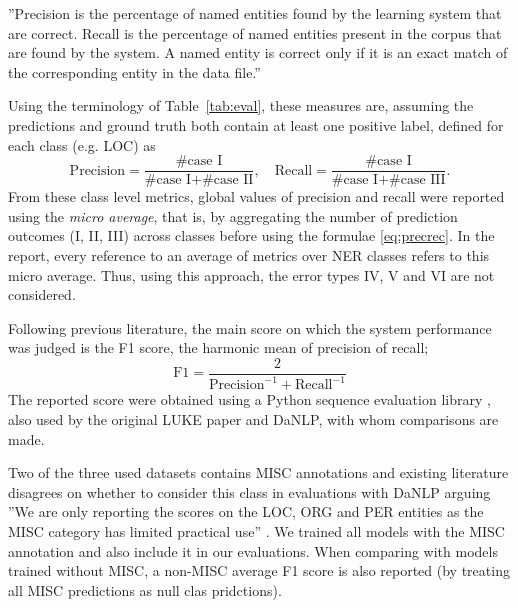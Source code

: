 \documentclass[main.tex]{subfiles}
\begin{document}
''Precision is the percentage of named entities found by the learning system that are correct.
Recall is the percentage of named entities present in the corpus that are found by the system.
A named entity is correct only if it is an exact match of the corresponding entity in the data file.''
\cite[Sec 2.4]{tjang2003conll}

Using the terminology of Table~\ref{tab:eval}, these measures are, assuming the predictions and ground truth both contain at least one positive label, defined for each class (e.g. LOC) as
\begin{equation}
    \label{eq:precrec}
    \text{Precision} = \frac{\text{\# case I}}{\text{\# case I} + \text{\# case II}},\quad \text{Recall} = \frac{\text{\# case I}}{\text{\# case I} + \text{\# case III}}.
\end{equation}
From these class level metrics, global values of precision and recall were reported using the \emph{micro average}, that is, by aggregating the number of prediction outcomes (I, II, III) across classes before using the formulae \eqref{eq:precrec}.
In the report, every reference to an average of metrics over NER classes refers to this micro average.
Thus, using this approach, the error types IV, V and VI are not considered\footnotemark.

Following previous literature, the main score on which the system performance was judged is the F1 score, the harmonic mean of precision of recall;
\begin{equation}
    \label{eq:f1}
    \text{F1} = \dfrac{2}{\text{Precision}^{-1} + \text{Recall}^{-1}}
\end{equation}
The reported score were obtained using a Python sequence evaluation library \cite{seqeval}, also used by the original LUKE paper and DaNLP, with whom comparisons are made.

Two of the three used datasets contains MISC annotations and existing literature disagrees on whether to consider this class in evaluations with DaNLP arguing
''We are only reporting the scores on the LOC, ORG and PER entities as the MISC category has limited practical use'' \cite[Sec. ''Benchmarks'' in NER page]{danlp2021}.
We trained all models with the MISC annotation and also include it in our evaluations.
When comparing with models trained without MISC, a non-MISC average F1 score is also reported (by treating all MISC predictions as null clas pridctions).
\end{document}
